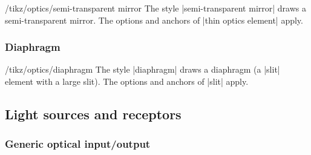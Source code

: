 \documentclass[a4paper]{ltxdoc}
\begin{document}
\begin{stylekey}{/tikz/optics/semi-transparent mirror}
The style |semi-transparent mirror| draws a semi-transparent mirror.
The options and anchors of |thin optics element| apply.

\begin{codeexample}[width=6cm]
\end{codeexample}
\end{stylekey}

\subsubsection{Diaphragm}

\begin{stylekey}{/tikz/optics/diaphragm}
The style |diaphragm| draws a diaphragm (a |slit| element with a large slit). 
The options and anchors of |slit| apply.

\begin{codeexample}[width=6cm]
\end{codeexample}
\end{stylekey}


\subsection{Light sources and receptors}

\subsubsection{Generic optical input/output}
\end{document}
